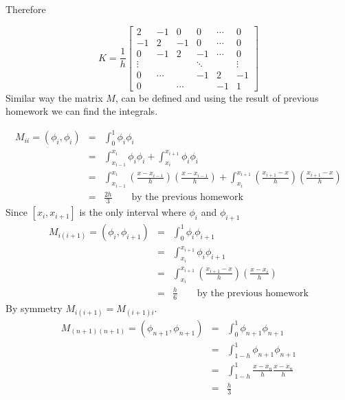 {\begin{solution}
\begin{enumerate}
Therefore

\[
K= \frac{1}{h}\left[\begin{array}{rrrrrrr}
              2 & -1 & 0 & 0 &  \cdots & 0 \\[0.25em]
               -1 & 2 & -1 &0 & \cdots & 0 \\
                0& -1 & 2 & -1 & \cdots & 0\\
                 \vdots & & &\ddots &  & \vdots \\[0.25em]
                 0 & \cdots &  & -1& 2 & -1 \\ 
                 0 & &\cdots &  & -1 & 1 
                   \end{array}\right]
                   \]
Similar way the matrix $M$, can be defined and using the result of previous homework we can find the integrals.

\begin{eqnarray*}
M_{ii} = (\phi_i, \phi_i) &=& \int_0^1 \phi_i \phi_i\\
												&=& \int_{x_{i-1}}^{x_i}  \phi_i \phi_i + \int_{x_{i}}^{x_{i+1}}  \phi_i \phi_i\\
												&=&\int_{x_{i-1}}^{x_i}  (\frac{x-x_{i-1}}{h}) ( \frac{x-x_{i-1}}{h}) + \int_{x_{i}}^{x_{i+1}}   (\frac{x_{i+1}-x}{h}) (\frac{x_{i+1}-x}{h}) \\
												&=& \frac{2h}{3} \qquad \mbox{by the previous homework}
\end{eqnarray*}
Since $[x_i, x_{i+1}]$ is the only interval where $\phi_i$ and $\phi_{i+1}$ 
\begin{eqnarray*}
M_{i(i+1)} = (\phi_i, \phi_{i+1}) &=& \int_0^1 \phi_i \phi_{i+1}\\
												&=& \int_{x_{i}}^{x_{i+1}}  \phi_i \phi_{i+1}\\
												&=&\int_{x_{i}}^{x_{i+1}}   (\frac{x_{i+1}-x}{h})  (\frac{x-x_{i}}{h}) \\
												&=& \frac{h}{6} \qquad \mbox{by the previous homework}
\end{eqnarray*}
By symmetry $M_{i(i+1)}= M_{(i+1)i}$.
\begin{eqnarray*}
M_{(n+1)(n+1)} = (\phi_{n+1}, \phi_{n+1}) &=& \int_0^1 \phi_{n+1} \phi_{n+1}\\
												&=& \int_{1-h}^{1}  \phi_{n+1} \phi_{n+1}\\
												&=&\int_{1-h}^{1}  \frac{x - x_{n}}{h}  \frac{x - x_{n}}{h}\\
												&=& \frac{h}{3}
\end{eqnarray*}


\end{enumerate}
\end{solution}}
